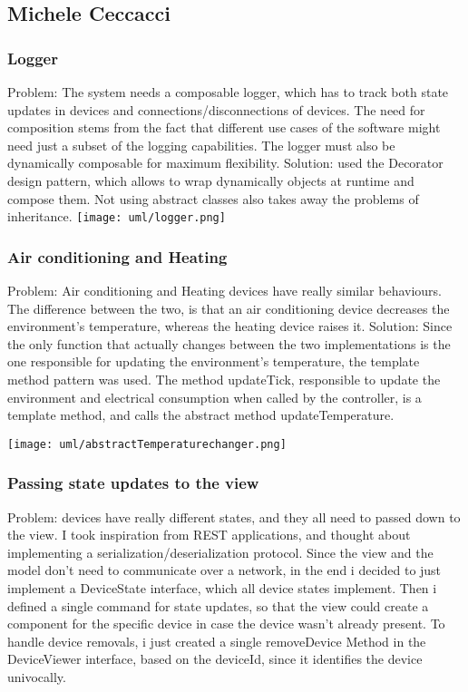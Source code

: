 \subsection{Michele Ceccacci}

\subsubsection{Logger} 
Problem: The system needs a composable logger, which has to track both state updates in devices and connections/disconnections
of devices. The need for composition stems from the fact that different use cases of the software might need just a subset
of the logging capabilities. The logger must also be dynamically composable for maximum flexibility.
Solution: used the Decorator design pattern, which allows to wrap dynamically objects at runtime and compose them.
Not using abstract classes also takes away the problems of inheritance. \newline
\texttt{[image: uml/logger.png]}

\subsubsection{Air conditioning and Heating}
Problem: 
Air conditioning and Heating devices have really similar behaviours. The difference between the two, is that an air conditioning
device decreases the environment's temperature, whereas the heating device raises it.
Solution: Since the only function that actually changes between the two implementations is the one responsible for updating the
environment's temperature, the template method pattern was used. 
The method updateTick, responsible to update the environment and electrical consumption when called by the controller,
is a template method, and calls the abstract method updateTemperature. \newline

\texttt{[image: uml/abstractTemperaturechanger.png]}

\subsubsection{Passing state updates to the view}
Problem: devices have really different states, and they all need to passed down to the view.
I took inspiration from REST applications, and thought about implementing a  serialization/deserialization protocol.
Since the view and the model don't need to communicate over a network, in the end i decided to just implement a DeviceState interface, 
which all device states implement.
Then i defined a single command for state updates, so that the view could create a component for the specific device in case
the device wasn't already present. To handle device removals, i just created a single removeDevice Method in the DeviceViewer interface, 
based on the deviceId, since it identifies the device univocally. \newline %
